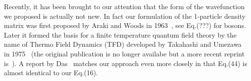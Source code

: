 \documentclass[pra]{revtex4-1}
\begin{document}
Recently, it has been brought to our attention that the form of the wavefunction
we proposed is actually not new. In fact our formulation of the 1-particle 
density matrix was first proposed by Araki and Woods in 1963~\cite{Araki_1963},
see Eq.(???) for bosons. Later it formed the basis for a finite temperature
quantum field theory by the name of Thermo Field Dynamics (TFD) developed by
Takahashi and Umezawa in 1975~\cite{TAKAHASHI_1975} (the original publication
is no longer availabe but a more recent reprint is~\cite{TAKAHASHI_1996}).
A report by Das~\cite{das2000topics} matches our approach even more closely in
that Eq.(44) is almost identical to our Eq.(16).




\end{document}
